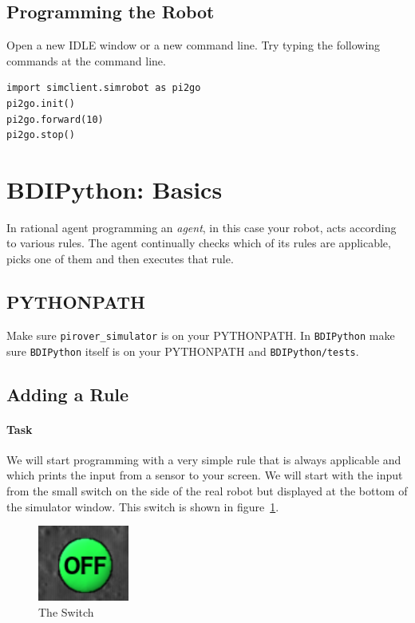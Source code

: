 \documentclass[a4,12pt]{article}
\begin{document}
\subsection{Programming the Robot}

Open a new IDLE window or a new command line.  Try typing the following commands at the command line.

\begin{verbatim}
import simclient.simrobot as pi2go
pi2go.init()
pi2go.forward(10)
pi2go.stop()
\end{verbatim}


\section{BDIPython: Basics}
In rational agent programming an \emph{agent}, in this case your robot, acts according to various rules.  The agent continually checks which of its rules are applicable, picks one of them and then executes that rule.

\subsection{PYTHONPATH}

Make sure \lstinline{pirover_simulator} is on your PYTHONPATH.  In \lstinline{BDIPython} make sure \lstinline{BDIPython} itself is on your PYTHONPATH and \lstinline{BDIPython/tests}.

\subsection{Adding a Rule}
\label{sec:adding_a_rule}

\paragraph{Task} We will start programming with a very simple rule that is always applicable and which prints the input from a sensor to your screen.  We will start with the input from the small switch on the side of the real robot but displayed at the bottom of the simulator window.  This switch is shown in figure~\ref{fig:switch}.

\begin{figure}[htbp]
  \begin{center}
    \includegraphics[width=3cm]{images/switch.png}
  \end{center}
  \caption{The Switch}
  \label{fig:switch}
\end{figure}
\end{document}
